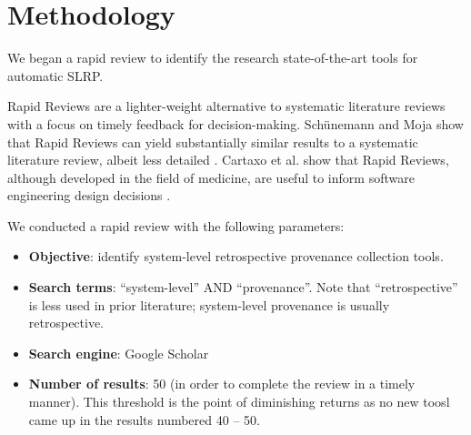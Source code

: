 \section{Methodology}

We began a rapid review to identify the research state-of-the-art tools for automatic SLRP.


Rapid Reviews are a lighter-weight alternative to systematic literature reviews with a focus on timely feedback for decision-making.
Sch\"unemann and Moja show that Rapid Reviews can yield substantially similar results to a systematic literature review, albeit less detailed \cite{schunemann_reviews_2015}.
Cartaxo et al. show that Rapid Reviews, although developed in the field of medicine, are useful to inform software engineering design decisions \cite{cartaxo_role_2018,cartaxo_rapid_2020}.

We conducted a rapid review with the following parameters:

\begin{itemize}
\item \textbf{Objective}: identify system-level retrospective provenance collection tools.

\item \textbf{Search terms}: ``system-level'' AND ``provenance''.
Note that ``retrospective'' is less used in prior literature; system-level provenance is usually retrospective.

\item \textbf{Search engine}: Google Scholar

\item \textbf{Number of results}: 50 (in order to complete the review in a timely manner).
This threshold is the point of diminishing returns as no new toosl came up in the results numbered 40 -- 50.
\end{itemize}


